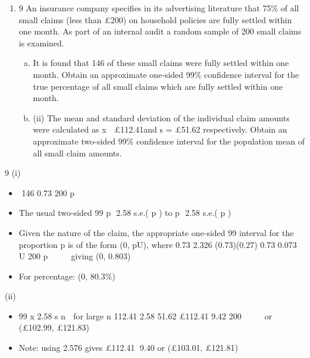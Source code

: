 \documentclass[a4paper,12pt]{article}
\begin{document}
\begin{enumerate}
\item 9 An insurance company specifies in its advertising literature that 75\% of all small claims (less than £200) on household policies are fully settled within one month. As part of an internal audit a random sample of 200 small claims is examined.
\begin{enumerate}[(a)]
    \item It is found that 146 of these small claims were fully settled within one month.
Obtain an approximate one-sided 99\% confidence interval for the true
percentage of all small claims which are fully settled within one month. 
\item (ii) The mean and standard deviation of the individual claim amounts were calculated as x  £112.41and s = £51.62 respectively. Obtain an approximate
two-sided 99\% confidence interval for the population mean of all small claim amounts. 
\end{enumerate}

\end{enumerate}
\newpage

9 (i)
\begin{itemize} \item  146 0.73
200
p 
\item The usual two-sided 99%
p  2.58 s.e.( p ) to p  2.58 s.e.( p )
\item Given the nature of the claim, the appropriate one-sided 99%
interval for the proportion p is of the form (0, pU),
where 0.73 2.326 (0.73)(0.27) 0.73 0.073
U 200 p     giving (0, 0.803)
\item For percentage: (0, 80.3\%)
\end{itemize}
(ii) 
\begin{itemize} \item 99%
x 2.58 s
n
 for large n
112.41 2.58 51.62 £112.41 9.42
200
    or (£102.99, £121.83)
\item Note: using 2.576 gives £112.41 9.40 or (£103.01, £121.81)
\end{itemize}
\end{document}
